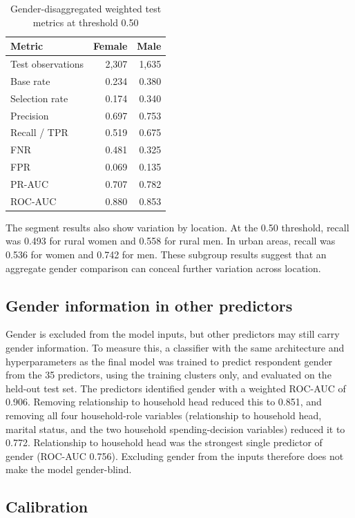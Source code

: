 \documentclass[11pt,a4paper]{article}
\begin{document}
\begin{table}[H]
\centering
\caption{Gender-disaggregated weighted test metrics at threshold 0.50}
\label{tab:gender}
\begin{tabular}{lrr}
\toprule
Metric & Female & Male\\
\midrule
Test observations & 2,307 & 1,635\\
Base rate & 0.234 & 0.380\\
Selection rate & 0.174 & 0.340\\
Precision & 0.697 & 0.753\\
Recall / TPR & 0.519 & 0.675\\
FNR & 0.481 & 0.325\\
FPR & 0.069 & 0.135\\
PR-AUC & 0.707 & 0.782\\
ROC-AUC & 0.880 & 0.853\\
\bottomrule
\end{tabular}
\end{table}

The segment results also show variation by location. At the 0.50 threshold, recall was 0.493 for rural women and 0.558 for rural men. In urban areas, recall was 0.536 for women and 0.742 for men. These subgroup results suggest that an aggregate gender comparison can conceal further variation across location.

\subsection{Gender information in other predictors}

Gender is excluded from the model inputs, but other predictors may still carry gender information. To measure this, a classifier with the same architecture and hyperparameters as the final model was trained to predict respondent gender from the 35 predictors, using the training clusters only, and evaluated on the held-out test set. The predictors identified gender with a weighted ROC-AUC of 0.906. Removing relationship to household head reduced this to 0.851, and removing all four household-role variables (relationship to household head, marital status, and the two household spending-decision variables) reduced it to 0.772. Relationship to household head was the strongest single predictor of gender (ROC-AUC 0.756). Excluding gender from the inputs therefore does not make the model gender-blind.

\subsection{Calibration}
\end{document}
